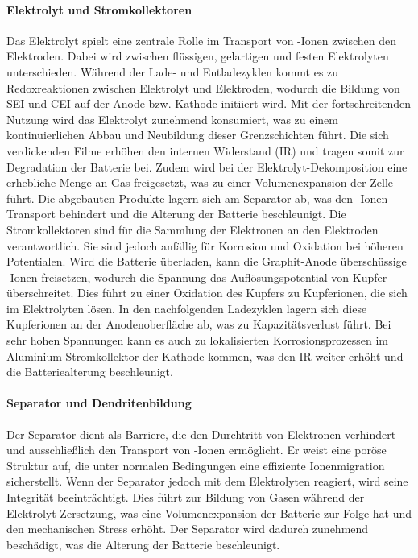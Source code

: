 \paragraph{Elektrolyt und Stromkollektoren} Das Elektrolyt spielt eine zentrale Rolle im Transport von -Ionen zwischen den Elektroden. Dabei wird zwischen flüssigen, gelartigen und festen Elektrolyten unterschieden. Während der Lade- und Entladezyklen kommt es zu Redoxreaktionen zwischen Elektrolyt und Elektroden, wodurch die Bildung von SEI und CEI auf der Anode bzw. Kathode initiiert wird. Mit der fortschreitenden Nutzung wird das Elektrolyt zunehmend konsumiert, was zu einem kontinuierlichen Abbau und Neubildung dieser Grenzschichten führt. Die sich verdickenden Filme erhöhen den internen Widerstand (IR) und tragen somit zur Degradation der Batterie bei. Zudem wird bei der Elektrolyt-Dekomposition eine erhebliche Menge an Gas freigesetzt, was zu einer Volumenexpansion der Zelle führt. Die abgebauten Produkte lagern sich am Separator ab, was den -Ionen-Transport behindert und die Alterung der Batterie beschleunigt.
Die Stromkollektoren sind für die Sammlung der Elektronen an den Elektroden verantwortlich. Sie sind jedoch anfällig für Korrosion und Oxidation bei höheren Potentialen. Wird die Batterie überladen, kann die Graphit-Anode überschüssige -Ionen freisetzen, wodurch die Spannung das Auflösungspotential von Kupfer überschreitet. Dies führt zu einer Oxidation des Kupfers zu Kupferionen, die sich im Elektrolyten lösen. In den nachfolgenden Ladezyklen lagern sich diese Kupferionen an der Anodenoberfläche ab, was zu Kapazitätsverlust führt. Bei sehr hohen Spannungen kann es auch zu lokalisierten Korrosionsprozessen im Aluminium-Stromkollektor der Kathode kommen, was den IR weiter erhöht und die Batteriealterung beschleunigt.
\paragraph{Separator und Dendritenbildung}

Der Separator dient als Barriere, die den Durchtritt von Elektronen verhindert und ausschließlich den Transport von -Ionen ermöglicht. Er weist eine poröse Struktur auf, die unter normalen Bedingungen eine effiziente Ionenmigration sicherstellt. Wenn der Separator jedoch mit dem Elektrolyten reagiert, wird seine Integrität beeinträchtigt. Dies führt zur Bildung von Gasen während der Elektrolyt-Zersetzung, was eine Volumenexpansion der Batterie zur Folge hat und den mechanischen Stress erhöht. Der Separator wird dadurch zunehmend beschädigt, was die Alterung der Batterie beschleunigt.

